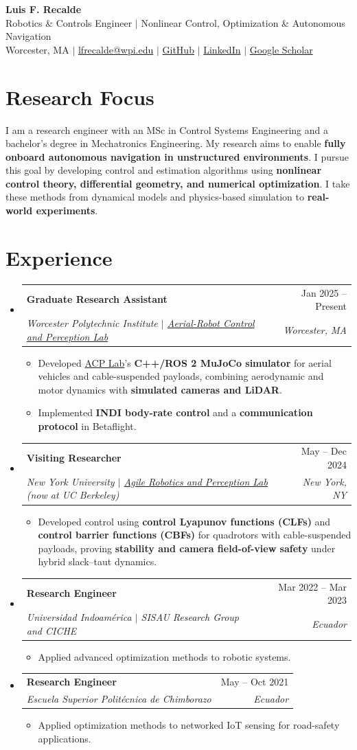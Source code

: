 \documentclass[letterpaper,11pt]{article}
\makeatletter
\newcommand{\resumeItem}[1]{
  \item {\small #1\par}\vspace{-2pt}
}
\newcommand{\resumeSubheading}[4]{
  \vspace{-2pt}\item
    \begin{tabular*}{0.97\textwidth}[t]{l@{\extracolsep{\fill}}r}
      \textbf{#1} & #2 \\
      \textit{\small#3} & \textit{\small #4} \\
    \end{tabular*}\vspace{-7pt}
}
\newcommand{\resumeSubHeadingListStart}{\begin{itemize}[leftmargin=0.15in, label={}, topsep=3pt]}
\newcommand{\resumeSubHeadingListEnd}{\end{itemize}}
\newcommand{\resumeItemListStart}{\begin{itemize}}
\newcommand{\resumeItemListEnd}{\end{itemize}\vspace{-5pt}}
\makeatother
\begin{document}
\begin{center}
\textcolor{HeadingNavy}{\textbf{\Huge Luis F. Recalde}} \\ \vspace{3pt}
\small Robotics \& Controls Engineer $|$ Nonlinear Control, Optimization \& Autonomous Navigation \\ \vspace{3pt}
Worcester, MA $|$ \href{mailto:lfrecalde@wpi.edu}{lfrecalde@wpi.edu} $|$
\href{https://github.com/lfrecalde1}{GitHub} $|$
\href{https://www.linkedin.com/in/luis-f-recalde-8a6432123}{LinkedIn} $|$
\href{https://scholar.google.com/citations?user=_v1511cAAAAJ}{Google Scholar}
\end{center}
\vspace{-12pt}
\section{Research Focus}
{\small I am a research engineer with an MSc in Control Systems Engineering and a bachelor's degree in Mechatronics Engineering.
My research aims to enable \textbf{fully onboard autonomous navigation in unstructured environments}.
I pursue this goal by developing control and estimation algorithms using \textbf{nonlinear control theory, differential geometry, and numerical optimization}.
I take these methods from dynamical models and physics-based simulation to \textbf{real-world experiments}.\par}
\section{Experience}
\resumeSubHeadingListStart
\resumeSubheading{Graduate Research Assistant}{Jan 2025 -- Present}
{Worcester Polytechnic Institute $|$ \href{https://acp-lab.github.io/acplab-web/}{Aerial-Robot Control and Perception Lab}}{Worcester, MA}
\resumeItemListStart
\resumeItem{Developed \href{https://acp-lab.github.io/acplab-web/}{ACP Lab}'s \textbf{C++/ROS 2 MuJoCo simulator} for aerial vehicles and cable-suspended payloads, combining aerodynamic and motor dynamics with \textbf{simulated cameras and LiDAR}.}
\resumeItem{Implemented \textbf{INDI body-rate control} and a \textbf{communication protocol} in Betaflight.}
\resumeItemListEnd
\resumeSubheading{Visiting Researcher}{May -- Dec 2024}
{New York University $|$ \href{https://arplaboratory.github.io/}{Agile Robotics and Perception Lab} (now at UC Berkeley)}{New York, NY}
\resumeItemListStart
\resumeItem{Developed control using \textbf{control Lyapunov functions (CLFs)} and \textbf{control barrier functions (CBFs)} for quadrotors with cable-suspended payloads, proving \textbf{stability and camera field-of-view safety} under hybrid slack--taut dynamics.}
\resumeItemListEnd
\resumeSubheading{Research Engineer}{Mar 2022 -- Mar 2023}
{Universidad Indoam\'erica $|$ SISAU Research Group and CICHE}{Ecuador}
\resumeItemListStart
\resumeItem{Applied advanced optimization methods to robotic systems.}
\resumeItemListEnd
\resumeSubheading{Research Engineer}{May -- Oct 2021}
{Escuela Superior Polit\'ecnica de Chimborazo}{Ecuador}
\resumeItemListStart
\resumeItem{Applied optimization methods to networked IoT sensing for road-safety applications.}
\resumeItemListEnd
\resumeSubHeadingListEnd
\end{document}
